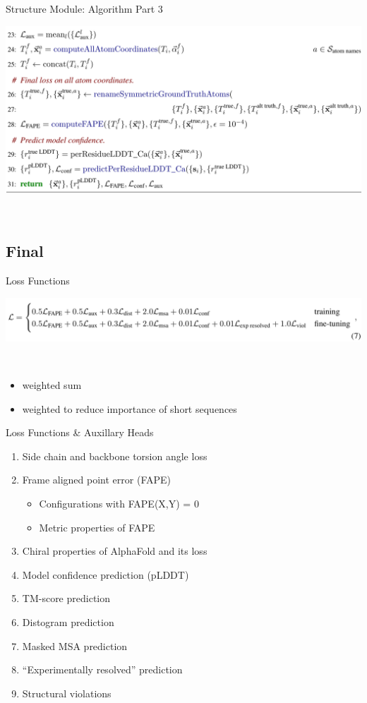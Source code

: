 \documentclass[presentation, smaller]{beamer}
\begin{document}
\begin{frame}[label={sec:orge205c0b}]{Structure Module: Algorithm Part 3}
\begin{center}
\includegraphics[width=.9\linewidth]{./imgs/algo20-part3.png}
\end{center}~\cite{jumperHighlyAccurateProtein2021}
\end{frame}


\subsection*{Final}
\label{sec:orgbabc6ea}
\begin{frame}[label={sec:orgde9291a}]{Loss Functions}
\begin{center}
\includegraphics[width=.9\linewidth]{./imgs/loss-eq.png}
\end{center}~\cite{jumperHighlyAccurateProtein2021}

\begin{itemize}
\item weighted sum
\item weighted to reduce importance of short sequences
\end{itemize}
\end{frame}

\begin{frame}[label={sec:org4533e99}]{Loss Functions \& Auxillary Heads}
\begin{enumerate}
\item Side chain and backbone torsion angle loss
\item Frame aligned point error (FAPE)
\begin{itemize}
\item Configurations with FAPE(X,Y) = 0
\item Metric properties of FAPE
\end{itemize}
\item Chiral properties of AlphaFold and its loss
\item Model confidence prediction (pLDDT)
\item TM-score prediction
\item Distogram prediction
\item Masked MSA prediction
\item ``Experimentally resolved'' prediction
\item Structural violations
\end{enumerate}~\cite{jumperHighlyAccurateProtein2021}
\end{frame}
\end{document}
